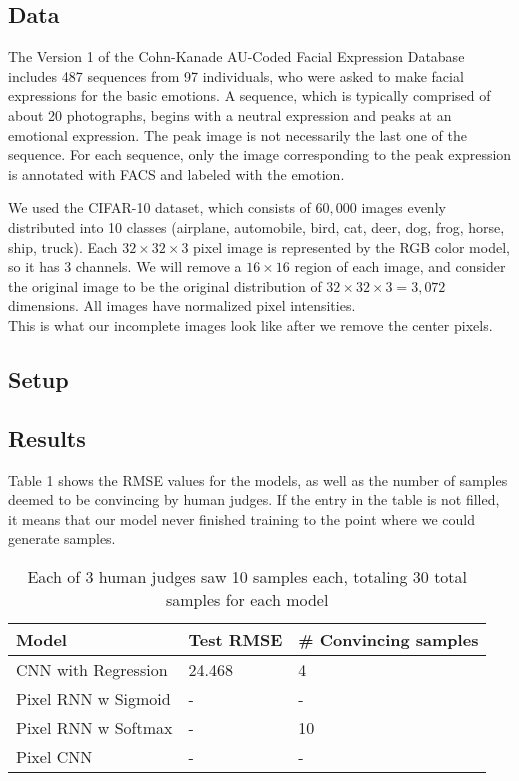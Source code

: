 \documentclass[10pt,twocolumn,letterpaper]{article}
\begin{document}
\subsection{Data}
The Version 1 of the Cohn-Kanade AU-Coded Facial Expression Database \cite{ck} includes 487 sequences from 97 individuals, who were asked to make facial expressions for the basic emotions. A sequence, which is typically comprised of about 20 photographs, begins with a neutral expression and peaks at an emotional expression. The peak image is not necessarily the last one of the sequence. For each sequence, only the image corresponding to the peak expression is annotated with FACS and labeled with the emotion.


We used the CIFAR-10 dataset, which consists of $60,000$ images evenly distributed into 10 classes (airplane, automobile, bird, cat, deer, dog, frog, horse, ship, truck). Each $32 \times 32 \times 3$ pixel image is represented by the RGB color model, so it has 3 channels. We will remove a $16 \times 16$ region of each image, and consider the original image to be the original distribution of $32 \times 32 \times 3 = 3,072$ dimensions. All images have normalized pixel intensities. \\

This is what our incomplete images look like after we remove the center pixels.\\



\subsection{Setup}

\subsection{Results}
Table 1 shows the RMSE values for the models, as well as the number of samples deemed to be convincing by human judges. If the entry in the table is not filled, it means that our model never finished training to the point where we could generate samples.
\begin{table}[!ht]
\centering
\caption{Each of 3 human judges saw 10 samples each, totaling 30 total samples for each model}
\begin{tabular}{lll}
\hline
Model               & Test RMSE & \# Convincing samples \\ \hline
CNN with Regression & 24.468    &  4                     \\
Pixel RNN w Sigmoid &   -       &  -                     \\
Pixel RNN w Softmax &   -       &  10                     \\
Pixel CNN           &   -       &  -                     \\ \hline
\end{tabular}
\end{table}
\end{document}
